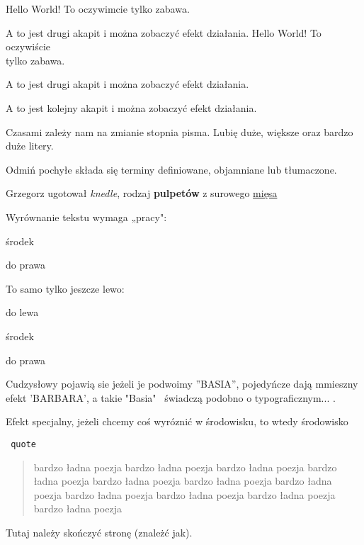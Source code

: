 \documentclass[11pt]{article}
\begin{document}
Hello World! To oczywimcie tylko zabawa.

A to jest drugi akapit i można zobaczyć efekt działania.
Hello World! To oczywiście\\ tylko zabawa.

A to jest drugi akapit i można \linebreak zobaczyć efekt działania.

A to jest kolejny akapit i można \newline zobaczyć efekt działania.

Czasami zależy nam na zmianie stopnia pisma. Lubię {\large duże}, {\Large
większe} oraz {\LARGE bardzo duże} litery.

Odmiń pochyłe składa się terminy definiowane, objamniane lub tłumaczone. %

Grzegorz ugotował {\em knedle}, rodzaj {\bf pulpetów} z surowego \underline{mięsa}

Wyrównanie tekstu wymaga „pracy":
\begin{center}środek \end{center}
\begin{flushright}do prawa\end{flushright}

To samo tylko jeszcze lewo:
\begin{flushleft}do lewa \end{flushleft} 
\begin{center}środek \end{center}
\begin{flushright}do prawa\end{flushright}

Cudzysłowy pojawią sie jeżeli je podwoimy ''BASIA'', pojedyńcze dają mmieszny efekt 'BARBARA', a takie "Basia" \ świadczą podobno o typograficznym... .

Efekt specjalny, jeżeli chcemy coś wyróznić w środowisku, to wtedy środowisko
 
\verb+ quote+
\begin{quote}
bardzo ładna poezja bardzo ładna poezja bardzo ładna poezja 
bardzo ładna poezja bardzo ładna poezja bardzo ładna poezja 
bardzo ładna poezja bardzo ładna poezja bardzo ładna poezja 
bardzo ładna poezja bardzo ładna poezja \end{quote}

Tutaj należy skończyć stronę (znależć jak).
\newpage
\end{document}
